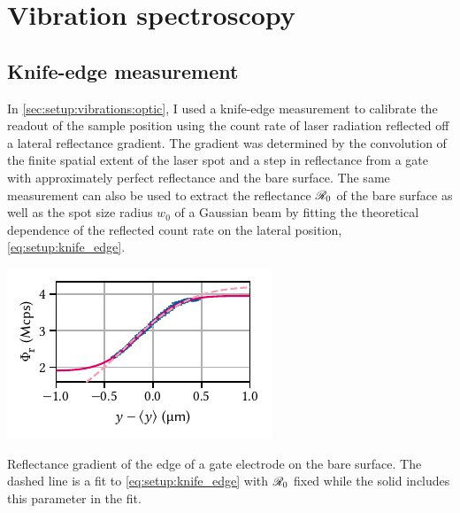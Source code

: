\section{Vibration spectroscopy}\label{sec:app:setup:vibrations}
\subsection{Knife-edge measurement}\label{subsec:app:setup:vibrations:knife_edge}
In \cref{sec:setup:vibrations:optic}, I used a knife-edge measurement to calibrate the readout of the sample position using the count rate of laser radiation reflected off a lateral reflectance gradient.
The gradient was determined by the convolution of the finite spatial extent of the laser spot and a step in reflectance from a  gate with approximately perfect reflectance and the bare  surface.
The same measurement can also be used to extract the reflectance $\mathscr{R}_{0}$ of the bare  surface as well as the spot size radius $w_0$ of a Gaussian beam by fitting the theoretical dependence of the reflected count rate on the lateral position, \cref{eq:setup:knife_edge}.

\begin{marginfigure}
    \centering
    \includegraphics{img/pdf/setup/knife_edge_erf}
    \caption[]{
        Reflectance gradient of the edge of a  gate electrode on the bare  surface.
        The dashed line is a fit to \cref{eq:setup:knife_edge} with $\mathscr{R}_0$ fixed while the solid includes this parameter in the fit.
    }
    \label{fig:app:setup:vibrations:knife_edge}
\end{marginfigure}

